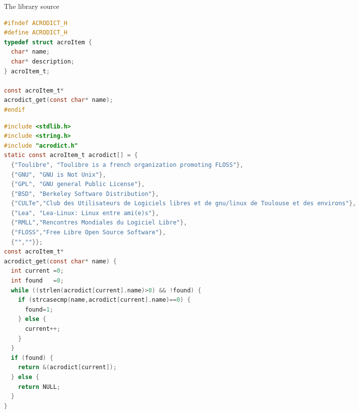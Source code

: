 \documentclass[compress,slidestop,table,usepdftitle=false
              ]
               {beamer}
\begin{document}
\begin{frame}[fragile]
\setlength{\columnsep}{0.8cm}
\vspace*{-0.5cm}
\begin{center}
The library source
\end{center}
\begin{multicols}{2}
\begin{lstlisting}[basicstyle=\tiny,language=C,breaklines=true]
#ifndef ACRODICT_H
#define ACRODICT_H
typedef struct acroItem {
  char* name;
  char* description;
} acroItem_t;

const acroItem_t*
acrodict_get(const char* name);
#endif
\end{lstlisting}
\begin{lstlisting}[basicstyle=\tiny,language=C,breaklines=true]
#include <stdlib.h>
#include <string.h>
#include "acrodict.h"
static const acroItem_t acrodict[] = {
  {"Toulibre", "Toulibre is a french organization promoting FLOSS"},
  {"GNU", "GNU is Not Unix"},
  {"GPL", "GNU general Public License"},
  {"BSD", "Berkeley Software Distribution"},
  {"CULTe","Club des Utilisateurs de Logiciels libres et de gnu/linux de Toulouse et des environs"},
  {"Lea", "Lea-Linux: Linux entre ami(e)s"},
  {"RMLL","Rencontres Mondiales du Logiciel Libre"},
  {"FLOSS","Free Libre Open Source Software"},
  {"",""}};
const acroItem_t*
acrodict_get(const char* name) {
  int current =0;
  int found   =0;
  while ((strlen(acrodict[current].name)>0) && !found) {
    if (strcasecmp(name,acrodict[current].name)==0) {
      found=1;
    } else {
      current++;
    }
  }
  if (found) {
    return &(acrodict[current]);
  } else {
    return NULL;
  }
}
\end{lstlisting}
\end{multicols}
\end{frame}

\end{document}

